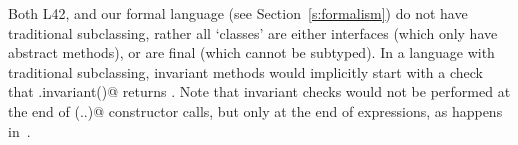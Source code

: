 Both L42, and our formal language (see Section~\ref{s:formalism}) do not have traditional subclassing, rather all `classes' are either interfaces (which only have abstract methods), or are final (which cannot be subtyped). In a language with traditional subclassing, invariant methods would implicitly start with a check that \Q@super.invariant()@ returns \Q@true@{}. Note that invariant checks would not be performed at the end of \Q@super(..)@ constructor calls, but only at the end of \Q@new@ expressions, as happens in~\cite{feldman2006jose}.

